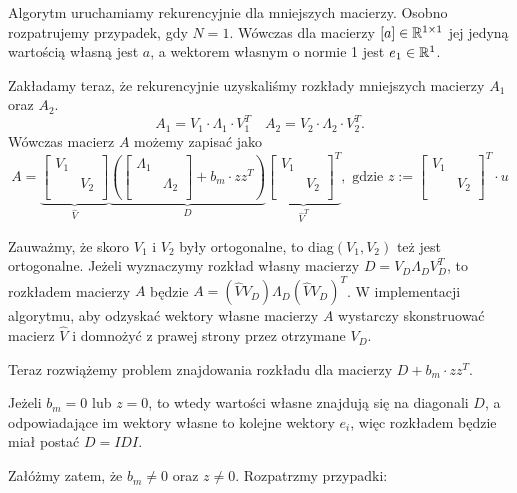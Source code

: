 \documentclass[a4paper,12pt]{article}
\begin{document}
Algorytm uruchamiamy rekurencyjnie dla mniejszych macierzy. Osobno rozpatrujemy przypadek,
gdy $N = 1$. Wówczas dla macierzy $\left[ a \right] \in \mathbb{R}^{1 \times 1}$ jej jedyną wartością
własną jest $a$, a wektorem własnym o normie 1 jest $e_1 \in \mathbb{R}^{1}$.

Zakładamy teraz, że rekurencyjnie uzyskaliśmy rozkłady mniejszych macierzy $A_1$ oraz $A_2$.
$$
    A_1 = V_1 \cdot \Lambda_1 \cdot V_1^T
    \quad
    A_2 = V_2 \cdot \Lambda_2 \cdot V_2^T.
$$
Wówczas macierz $A$ możemy zapisać jako
$$
    A = \underbrace{
        \begin{bmatrix}
            V_1 &     \\
                & V_2 \\
        \end{bmatrix}
    }_{\hat{V}}
    \underbrace{
        \left(
        \begin{bmatrix}
            \Lambda_1 &           \\
                      & \Lambda_2 \\
        \end{bmatrix}
        + b_m \cdot z z^T
        \right)
    }_{D}
    \underbrace{
        \begin{bmatrix}
            V_1 &     \\
                & V_2 \\
        \end{bmatrix}^T
    }_{\hat{V}^T},
    \text{ gdzie } z := \begin{bmatrix}
        V_1 &     \\
            & V_2 \\
    \end{bmatrix}^T \cdot u
$$

Zauważmy, że skoro $V_1$ i $V_2$ były ortogonalne, to diag$(V_1, V_2)$ też jest ortogonalne.
Jeżeli wyznaczymy rozkład własny macierzy $D = V_D \Lambda_D V_D^T$, to rozkładem
macierzy $A$ będzie $A = (\hat{V} V_D) \Lambda_D (\hat{V} V_D)^T$.
W implementacji algorytmu, aby odzyskać wektory własne macierzy $A$ wystarczy
skonstruować macierz $\hat{V}$ i domnożyć z prawej strony przez otrzymane $V_D$.

Teraz rozwiążemy problem znajdowania rozkładu dla macierzy $D + b_m \cdot zz^T$.

Jeżeli $b_m = 0$ lub $z = 0$, to wtedy wartości własne znajdują się na diagonali $D$,
a odpowiadające im wektory własne to kolejne wektory $e_i$, więc rozkładem będzie miał
postać $D = I D I$.

Załóżmy zatem, że $b_m \neq 0$ oraz $z \neq 0$.
Rozpatrzmy przypadki:
\end{document}
